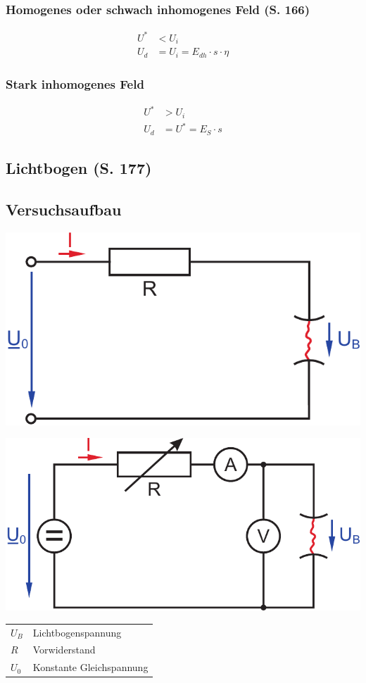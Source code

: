 \documentclass[a4paper,twocolumn,10pt]{article}
\begin{document}
\subsubsection{Homogenes oder schwach inhomogenes Feld (S. 166)}
\begin{equation*}
\begin{split}
U^*&<U_i\\
U_d&=U_i=E_{dh}\cdot s\cdot\eta
\end{split}
\end{equation*}

\subsubsection{Stark inhomogenes Feld}
\begin{equation*}
\begin{split}
U^*&>U_i\\
U_d&=U^*=E_S\cdot s
\end{split}
\end{equation*}

\subsection{Lichtbogen (S. 177)}

\subsection{Versuchsaufbau}
\begin{center}
\includegraphics[width=0.7\columnwidth]{Grafiken/Lichtbogen_Stromkreis}
\end{center}
\begin{center}
\includegraphics[width=0.7\columnwidth]{Grafiken/Lichtbogen_Stromkreis2}
\end{center}
\begin{tabular}{ll}
$U_B$ & Lichtbogenspannung\\
$R$ & Vorwiderstand\\
$U_0$ & Konstante Gleichspannung
\end{tabular}
\end{document}
